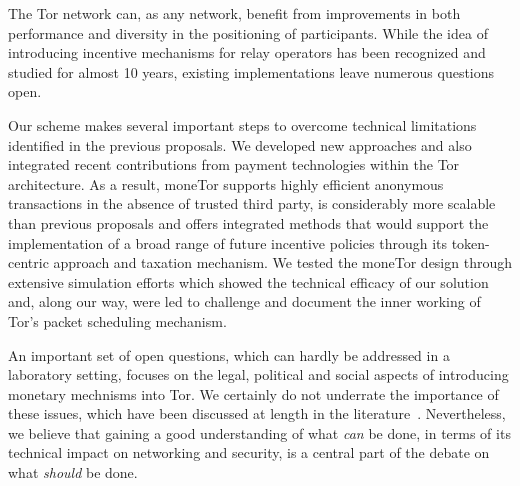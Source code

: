 The Tor network can, as any network, benefit from improvements in both performance and diversity in the positioning of participants.
While the idea of introducing incentive mechanisms for relay operators has been recognized and studied for almost 10 years, existing implementations leave numerous questions open.

Our scheme makes several important steps to overcome technical limitations identified in the previous proposals.
We developed new approaches and also integrated recent contributions from payment technologies within the Tor architecture.
As a result, moneTor supports highly efficient anonymous transactions in the absence of trusted third party, is considerably more scalable than previous proposals and offers integrated methods that would support the implementation of a broad range of future incentive policies through its token-centric approach and taxation mechanism.
We tested the moneTor design through extensive simulation efforts which showed the technical efficacy of our solution and, along our way, were led to challenge and document the inner working of Tor's packet scheduling mechanism.

An important set of open questions, which can hardly be addressed in a laboratory setting, focuses on the legal, political and social aspects of introducing monetary mechnisms into Tor.
We certainly do not underrate the importance of these issues, which have been discussed at length in the literature~\cite{jansenblogpost}.
Nevertheless, we believe that gaining a good understanding of what \emph{can} be done, in terms of its technical impact on networking and security, is a central part of the debate on what \emph{should} be done.

